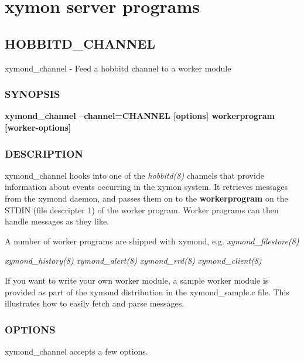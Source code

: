 %
\chapter{xymon server programs}

%

\section{HOBBITD\_CHANNEL}

 xymond\_channel - Feed a hobbitd channel to a worker module 

\subsection{SYNOPSIS}
\textbf{xymond\_channel --channel=CHANNEL [options] workerprogram [worker-options]}


 
\subsection{DESCRIPTION}
 xymond\_channel hooks into one of the \emph{hobbitd(8)} channels
 that provide information about events occurring in the xymon
 system. It retrieves messages from the xymond daemon, and passes
 them on to the \textbf{workerprogram} on the STDIN (file descripter
 1) of the worker program. Worker programs can then handle messages as
 they like. 


  A number of worker programs are shipped with xymond,
  e.g. \emph{xymond\_filestore(8)}

 \emph{xymond\_history(8)}
 \emph{xymond\_alert(8)}
 \emph{xymond\_rrd(8)}
 \emph{xymond\_client(8)}



  If you want to write your own worker module, a sample worker module
  is provided as part of the xymond distribution in the
  xymond\_sample.c file. This illustrates how to easily fetch and
  parse messages. 



 
\subsection{OPTIONS}
 xymond\_channel accepts a few options. 

